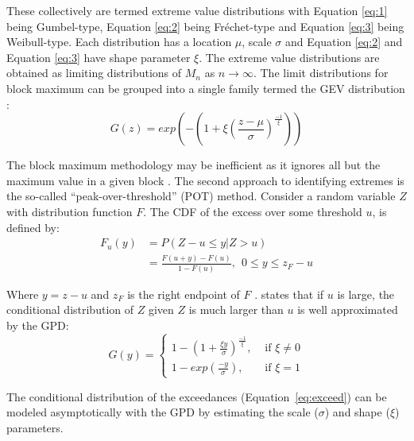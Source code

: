These collectively are termed extreme value distributions with Equation \ref{eq:1} being Gumbel-type, Equation \ref{eq:2} being Fr\'echet-type and Equation \ref{eq:3} being Weibull-type. Each distribution has a location $\mu$, scale $\sigma$ and Equation \ref{eq:2} and Equation \ref{eq:3} have shape parameter $\xi$. The extreme value distributions are obtained as limiting distributions of $M_n$ as $n \to \infty$. The limit distributions for block maximum can be grouped into a single family termed the \gls{GEV} distribution \citep{dehaan2007extreme}:
\begin{equation}
    G(z) = exp\left(-\left(1+\xi\left(\frac{z-\mu}{\sigma}\right)^{\frac{-1}{\xi}}\right)\right)
    \label{eq:GEV}
\end{equation}

The block maximum methodology may be inefficient as it ignores all but the maximum value in a given block \citep{davison2015statistics}. The second approach to identifying extremes is the so-called ``peak-over-threshold'' (POT) method. Consider a random variable $Z$ with distribution function $F$. The CDF of the excess over some threshold $u$, is defined by:
\begin{equation}
    \begin{aligned}
        F_u(y) & = P(Z - u \leq y | Z > u)                               \\
               & = \frac{F(u+y) - F(u)}{1-F(u)}, \ \ 0 \leq y \leq z_F-u
    \end{aligned}
    \label{eq:exceed}
\end{equation}

Where $y = z - u$ and $z_F$ is the right endpoint of $F$ \citep{gilli2006application}. \cite{pickands1975statistical} states that if $u$ is large, the conditional distribution of $Z$ given $Z$ is much larger than $u$ is well approximated by the \gls{GPD}:
\begin{equation}
    G(y) =
    \begin{cases}
        1 - \left(1 + \frac{\xi y}{\sigma}\right)^{\frac{-1}{\xi }}, & \text{ if } \xi  \neq 0 \\
        1-exp\left(\frac{-y}{\sigma} \right),                        & \text{ if } \xi  = 1
    \end{cases}
    \label{eq:GPD}
\end{equation}

The conditional distribution of the exceedances (Equation~\ref{eq:exceed}) can be modeled asymptotically with the \gls{GPD} by estimating the scale ($\sigma$) and shape ($\xi$) parameters.

